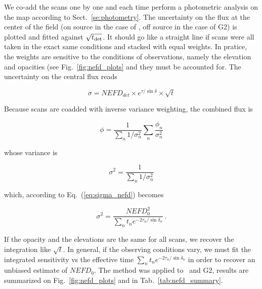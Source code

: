 We co-add the scans one by one and each time perform a photometric analysis on
the map according to Sect.~\ref{se:photometry}. The uncertainty on the flux at
the center of the field (on source in the case of \hls, off source in the case
of G2) is plotted and fitted against $\sqrt{t_{\rm{det}}}$. It should go like a
straight line if scans were all taken in the exact same conditions and stacked
with equal weights. In pratice, the weights are sensitive to the conditions of
observations, namely the elevation and opacities (see Fig.~\ref{fig:nefd_plots}
and they must be accounted for. The uncertainty on the central flux reads

\begin{equation}
\sigma = NEFD_{det}\times e^{\tau/\sin\delta}\times\sqrt{t}
\label{eq:sigma_nefd}
\end{equation}

Because scans are coadded with inverse variance weighting, the combined flux is

\begin{equation}
\phi = \frac{1}{\sum_n 1/\sigma_n^2}\sum_n\frac{\phi_n}{\sigma_n^2}
\end{equation}

whose variance is

\begin{equation}
\sigma^2 = \frac{1}{\sum_n 1/\sigma_n^2}
\end{equation}

which, according to Eq.~(\ref{eq:sigma_nefd}) becomes

\begin{equation}
\sigma^2 = \frac{NEFD_0^2}{\sum_{n}t_n e^{-2\tau_n/\sin\delta_n}}\,.
\label{eq:sigma_tau_w8}
\end{equation}

If the opacity and the elevations are the same for all scans, we recover the
integration like $\sqrt{t}$. In general, if the observing conditions vary, we
must fit the integrated sensitivity vs the effective time $\sum_{n}t_n
e^{-2\tau_n/\sin\delta_n}$ in order to recover an unbiased estimate of
$NEFD_0$. The method was applied to \hls\ and G2, results are summarized on
Fig.~\ref{fig:nefd_plots} and in Tab.~\ref{tab:nefd_summary}.

